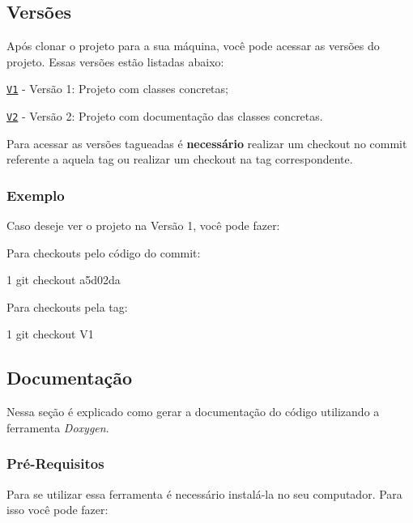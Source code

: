 \subsection*{Versões}

Após clonar o projeto para a sua máquina, você pode acessar as versões do projeto. Essas versões estão listadas abaixo\+:


\begin{DoxyItemize}
\item \href{https://bitbucket.org/KellerBreno/calculadora/commits/tag/V1}{\tt V1} -\/ Versão 1\+: Projeto com classes concretas;
\item \href{https://bitbucket.org/KellerBreno/calculadora/commits/tag/V2}{\tt V2} -\/ Versão 2\+: Projeto com documentação das classes concretas.
\end{DoxyItemize}

Para acessar as versões tagueadas é {\bfseries necessário} realizar um checkout no commit referente a aquela tag ou realizar um checkout na tag correspondente.

\subsubsection*{Exemplo}

Caso deseje ver o projeto na Versão 1, você pode fazer\+:

Para checkouts pelo código do commit\+:


\begin{DoxyCode}
1 git checkout a5d02da 
\end{DoxyCode}


Para checkouts pela tag\+: 
\begin{DoxyCode}
1 git checkout V1 
\end{DoxyCode}


\subsection*{Documentação}

Nessa seção é explicado como gerar a documentação do código utilizando a ferramenta {\itshape Doxygen}.

\subsubsection*{Pré-\/\+Requisitos}

Para se utilizar essa ferramenta é necessário instalá-\/la no seu computador. Para isso você pode fazer\+:

